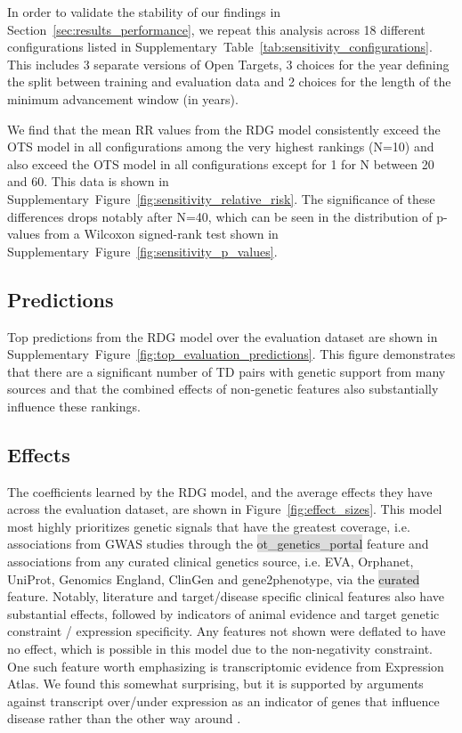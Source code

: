 \documentclass{article}
\begin{document}
In order to validate the stability of our findings in Section~\ref{sec:results_performance}, we repeat this analysis across 18 different configurations listed in Supplementary~Table~\ref{tab:sensitivity_configurations}. This includes 3 separate versions of Open Targets, 3 choices for the year defining the split between training and evaluation data and 2 choices for the length of the minimum advancement window (in years).

We find that the mean RR values from the RDG model consistently exceed the OTS model in all configurations among the very highest rankings (N=10) and also exceed the OTS model in all configurations except for 1 for N between 20 and 60. This data is shown in Supplementary~Figure~\ref{fig:sensitivity_relative_risk}. The significance of these differences drops notably after N=40, which can be seen in the distribution of p-values from a Wilcoxon signed-rank test shown in Supplementary~Figure~\ref{fig:sensitivity_p_values}.

\subsection{Predictions}

Top predictions from the RDG model over the evaluation dataset are shown in Supplementary~Figure~\ref{fig:top_evaluation_predictions}. This figure demonstrates that there are a significant number of TD pairs with genetic support from many sources and that the combined effects of non-genetic features also substantially influence these rankings. 

\subsection{Effects}

The coefficients learned by the RDG model, and the average effects they have across the evaluation dataset, are shown in Figure~\ref{fig:effect_sizes}. This model most highly prioritizes genetic signals that have the greatest coverage, i.e. associations from GWAS studies through the \colorbox{Gainsboro}{ot\_genetics\_portal} feature and associations from any curated clinical genetics source, i.e. EVA, Orphanet, UniProt, Genomics England, ClinGen and gene2phenotype, via the \colorbox{Gainsboro}{curated} \vspace*{0mm} feature.  Notably, literature and target/disease specific clinical features also have substantial effects, followed by indicators of animal evidence and target genetic constraint / expression specificity. Any features not shown were deflated to have no effect, which is possible in this model due to the non-negativity constraint. One such feature worth emphasizing is transcriptomic evidence from Expression Atlas. We found this somewhat surprising, but it is supported by arguments against transcript over/under expression as an indicator of genes that influence disease rather than the other way around \cite{PMID:34561431}.
\end{document}

